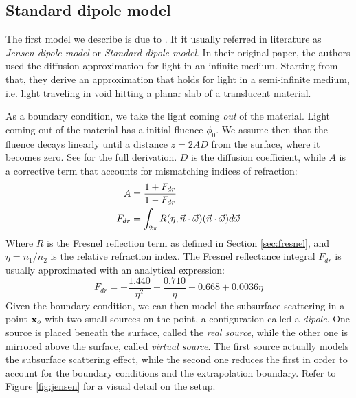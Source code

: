\subsection{Standard dipole model}
 
The first model we describe is due to \cite{Jensen:2001:PMS:383259.383319}. It it usually referred in literature as \emph{Jensen dipole model} or \emph{Standard dipole model}. In their original paper, the authors used the diffusion approximation for light in an infinite medium. Starting from that, they derive an approximation that holds for light in a semi-infinite medium, i.e. light traveling in void hitting a planar slab of a translucent material.

As a boundary condition, we take the light coming \emph{out} of the material. Light coming out of the material has a initial fluence $\phi_0$. We assume then that the fluence decays linearly until a distance $z = 2 A D$ from the surface, where it becomes zero. See \cite{Donner:2006:TRI:1236937} for the full derivation. $D$ is the diffusion coefficient, while $A$ is a corrective term that accounts for mismatching indices of refraction:
\begin{equation}
\begin{split}
A &= \frac{1 + F_{dr}}{1 - F_{dr}} \\
F_{dr} &= \int_{2\pi} R(\eta, \vec{n} \cdot \vec{\omega})  (\vec{n} \cdot \vec{\omega}) d \vec{\omega}
\end{split}
\end{equation}
Where $R$ is the Fresnel reflection term as defined in Section \ref{sec:fresnel}, and $\eta = n_1 / n_2$ is the relative refraction index. The Fresnel reflectance integral $F_{dr}$ is usually approximated with an analytical expression:
$$
F_{dr} = -\frac{1.440}{\eta^2} + \frac{0.710}{\eta} + 0.668 + 0.0036 \eta
$$
Given the boundary condition, we can then model the subsurface scattering in a point $\mathbf{x}_o$ with two small sources on the point, a configuration called a \emph{dipole}. One source is placed beneath the surface, called the \emph{real source}, while the other one is mirrored above the surface, called \emph{virtual source}. The first source actually models the subsurface scattering effect, while the second one reduces the first in order to account for the boundary conditions and the extrapolation boundary. Refer to Figure \ref{fig:jensen} for a visual detail on the setup.

